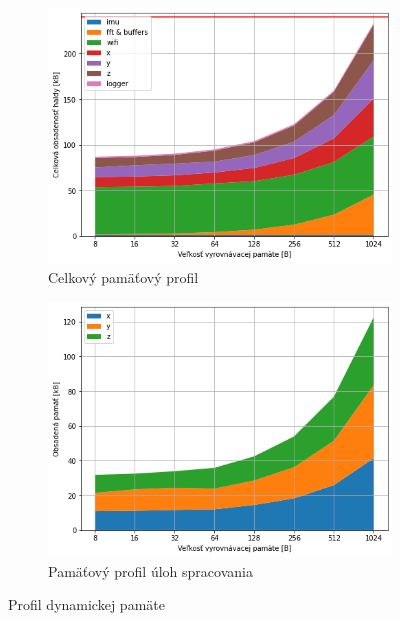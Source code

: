 \begin{figure}[h]
	\centering
    \begin{subfigure}[]{0.48\textwidth}
    	\centering
        \includegraphics[width=\textwidth]{figures/verification/memory-profile-bytes.png}
        \caption{Celkový pamäťový profil}
     \end{subfigure}
     \hfill
     \begin{subfigure}[]{0.48\textwidth}
        \centering
     	\includegraphics[width=\textwidth]{figures/verification/memory-profile-tasks.png}
     	\caption{Pamäťový profil úloh spracovania}
     \end{subfigure}
     \caption{Profil dynamickej pamäte}
\end{figure}

